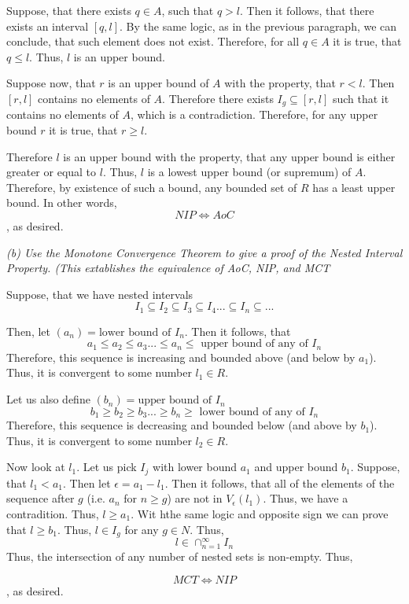 \documentclass[11pt,oneside,titlepage]{book}
\begin{document}
Suppose, that there exists  $q \in A$, such that $q > l$. Then it follows,
that there exists an interval $[q, l]$. By the same logic, as in the previous
paragraph, we can conclude, that such element does not exist. Therefore,
for all $q \in A$ it is true, that $q \leq l$. Thus, $l$ is an upper bound.

Suppose now, that $r$ is an upper bound of $A$ with the property, that
$r < l$. Then $[r, l]$ contains no elements of $A$. Therefore there exists
$I_g \subseteq [r, l]$ such that it contains no elements of $A$,
which is a contradiction. Therefore, for any upper bound $r$ it is true, that
$r \geq l$.

Therefore $l$ is an upper bound with the property, that any  upper bound
is either greater or equal to $l$. Thus, $l$ is a lowest upper bound
(or supremum) of $A$. Therefore, by existence of such a bound,
any bounded set of $R$ has a least  upper bound. In other words,
$$NIP\iff AoC$$
, as desired.

\textit{(b) Use the Monotone Convergence Theorem to give a proof of the
  Nested Interval Property. (This extablishes the equivalence of AoC,
  NIP, and MCT}

Suppose, that we have nested intervals
$$I_1 \subseteq I_2 \subseteq I_3 \subseteq I_4 ... \subseteq I_n \subseteq ...$$

Then, let $(a_n) = \text{lower bound of }I_n$. Then it follows, that
$$a_1 \leq a_2 \leq a_3 ... \leq a_n \leq \text{ upper bound of any of } I_n$$
Therefore, this sequence is increasing  and bounded above (and below by $a_1$).
Thus, it is convergent to some number $l_1 \in R$.

Let us also define $(b_n) = \text{upper bound of }I_n$
$$b_1 \geq b_2 \geq b_3 ... \geq b_n \geq \text{ lower bound of any of } I_n$$
Therefore, this sequence is decreasing  and bounded below (and above by $b_1$).
Thus, it is convergent to some number $l_2 \in R$.

Now look at $l_1$. Let us pick $I_j$ with lower  bound $a_1$ and upper bound
$b_1$. Suppose, that $l_1 < a_1$. Then let $\epsilon = a_1 - l_1$. Then it
follows, that all of the elements of the sequence after $g$ (i.e. $a_n$ for $n \geq g$) are not in $V_\epsilon(l_1)$. Thus, we have a contradition. Thus,
$l \geq a_1$. Wit hthe same logic and opposite sign we can prove that
$l \geq b_1$. Thus, $l \in I_g$ for any $g \in N$. Thus,
$$l \in \cap_{n = 1}^{\infty}I_n$$
Thus, the intersection of any number of nested sets is non-empty. Thus,

$$MCT \iff NIP$$
, as desired.
\end{document}
